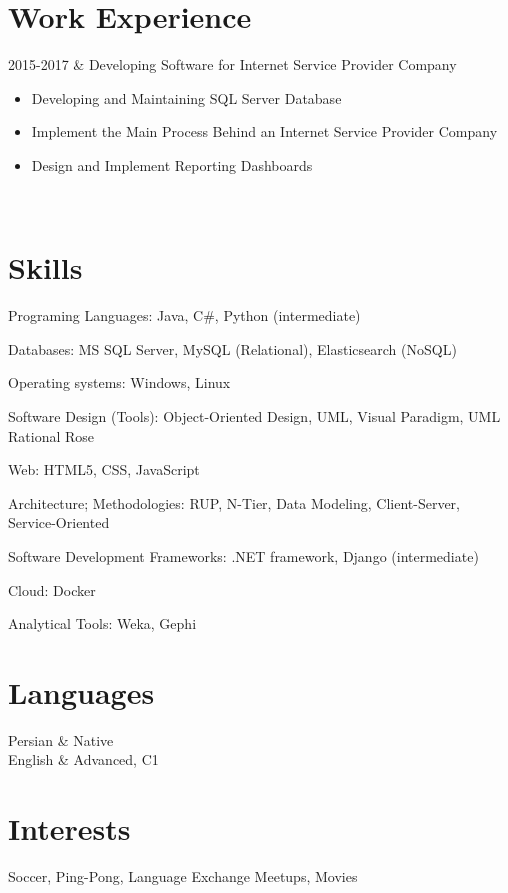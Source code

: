 \documentclass[
    changecolor={111, 156, 45}, 
]{cv-roald}
\begin{document}
\section*{Work Experience}
\begin{tabularcv}
2015-2017   &   
                \newline Developing Software for Internet Service Provider Company
                \begin{itemize}
                  \item Developing and Maintaining SQL Server Database
                  \item Implement the Main Process Behind an Internet Service Provider Company
                  \item Design and Implement Reporting Dashboards
                \end{itemize} 
              	\\
\end{tabularcv}   

\iffalse
	\section*{awards}
	\begin{tabularcv}
	2010        &   Winner of \emph{Turing} contest in Lancaster 
	($\pm$ 431 contenders). \link{http://someurl.com/}
	\end{tabularcv}
\fi


\section*{Skills}
Programing Languages: Java, C\#, Python (intermediate)

Databases: MS SQL Server, MySQL (Relational), Elasticsearch (NoSQL) 

Operating systems: Windows, Linux

Software Design (Tools): Object-Oriented Design, UML, Visual Paradigm, UML Rational Rose

Web: HTML5, CSS, JavaScript

Architecture; Methodologies: RUP, N-Tier, Data Modeling, Client-Server, Service-Oriented

Software Development Frameworks: .NET framework, Django (intermediate)

Cloud: Docker

Analytical Tools: Weka, Gephi

\section*{Languages}
\begin{tabularcv}
Persian     &	Native \\
English     &  	Advanced, C1 \\
\end{tabularcv}

\section*{Interests}
Soccer, Ping-Pong, Language Exchange Meetups, Movies
    
\end{document}
